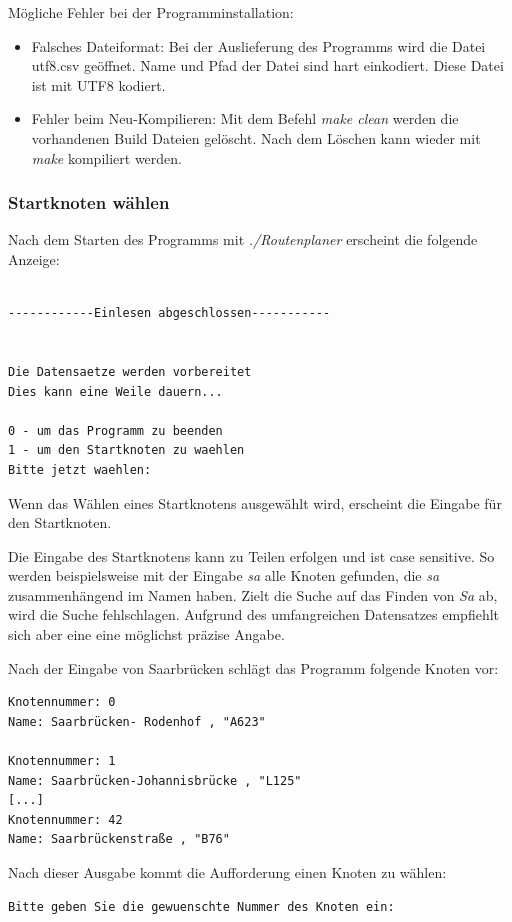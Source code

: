 \documentclass[12pt, a4paper, ngerman]{article}
\begin{document}
\smallskip
Mögliche Fehler bei der Programminstallation:
\begin{itemize}
	\item Falsches Dateiformat: Bei der Auslieferung des Programms wird die Datei utf8.csv geöffnet. Name und Pfad der Datei sind hart einkodiert. Diese Datei ist mit UTF8 kodiert. 	\item Fehler beim Neu-Kompilieren: Mit dem Befehl \textit{make clean}  werden die vorhandenen Build Dateien gelöscht. Nach dem Löschen kann wieder mit \textit{make} kompiliert werden.
\end{itemize}

\subsubsection{Startknoten wählen}
Nach dem Starten des Programms mit \textit{./Routenplaner} erscheint die folgende Anzeige:

\begin{lstlisting}

------------Einlesen abgeschlossen-----------


Die Datensaetze werden vorbereitet
Dies kann eine Weile dauern...

0 - um das Programm zu beenden
1 - um den Startknoten zu waehlen
Bitte jetzt waehlen:  
\end{lstlisting}

Wenn das Wählen eines Startknotens ausgewählt wird, erscheint die Eingabe für den Startknoten.

Die Eingabe des Startknotens kann zu Teilen erfolgen und ist case sensitive. So werden beispielsweise mit der Eingabe \textit{sa} alle Knoten gefunden, die \textit{sa} zusammenhängend im Namen haben. Zielt die Suche auf das Finden von \textit{Sa} ab, wird die Suche fehlschlagen. Aufgrund des umfangreichen Datensatzes empfiehlt sich aber eine eine möglichst präzise Angabe. 

Nach der Eingabe von Saarbrücken schlägt das Programm folgende Knoten vor:
\begin{lstlisting}
Knotennummer: 0
Name: Saarbrücken- Rodenhof , "A623"

Knotennummer: 1
Name: Saarbrücken-Johannisbrücke , "L125"
[...]
Knotennummer: 42
Name: Saarbrückenstraße , "B76"
\end{lstlisting} 
Nach dieser Ausgabe kommt die Aufforderung einen Knoten zu wählen:
\begin{lstlisting}
Bitte geben Sie die gewuenschte Nummer des Knoten ein:
\end{lstlisting}
\end{document}
